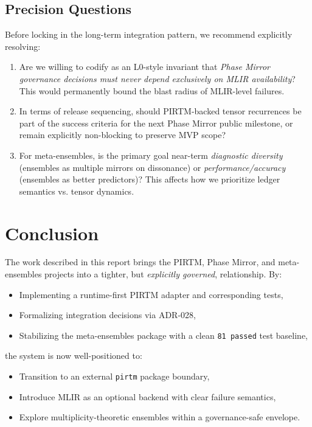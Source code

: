 \documentclass[11pt]{article}
\begin{document}
\subsection{Precision Questions}

Before locking in the long-term integration pattern, we recommend explicitly resolving:

\begin{enumerate}[label=(Q\arabic*)]
  \item Are we willing to codify as an L0-style invariant that \emph{Phase Mirror governance decisions must never depend exclusively on MLIR availability}? This would permanently bound the blast radius of MLIR-level failures.
  \item In terms of release sequencing, should PIRTM-backed tensor recurrences be part of the success criteria for the next Phase Mirror public milestone, or remain explicitly non-blocking to preserve MVP scope?
  \item For meta-ensembles, is the primary goal near-term \emph{diagnostic diversity} (ensembles as multiple mirrors on dissonance) or \emph{performance/accuracy} (ensembles as better predictors)? This affects how we prioritize ledger semantics vs. tensor dynamics.
\end{enumerate}

\section{Conclusion}

The work described in this report brings the PIRTM, Phase Mirror, and meta-ensembles projects into a tighter, but \emph{explicitly governed}, relationship. By:
\begin{itemize}
  \item Implementing a runtime-first PIRTM adapter and corresponding tests,
  \item Formalizing integration decisions via ADR-028,
  \item Stabilizing the meta-ensembles package with a clean \texttt{81 passed} test baseline,
\end{itemize}
the system is now well-positioned to:
\begin{itemize}
  \item Transition to an external \texttt{pirtm} package boundary,
  \item Introduce MLIR as an optional backend with clear failure semantics,
  \item Explore multiplicity-theoretic ensembles within a governance-safe envelope.
\end{itemize}
\end{document}
